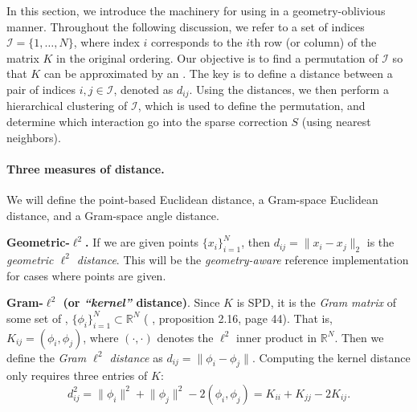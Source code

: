 In this section, we introduce the machinery for using \gofmm{} in a
geometry-oblivious manner. Throughout the following discussion, we refer to a
set of indices $\mathcal{I} = \{1,\dots,N\}$, where index $i$ corresponds to
the $i$th row (or column) of the matrix $K$ in the original ordering. Our
objective is to find a permutation of $\mathcal{I}$ so that $K$  can be
approximated by an \hmatrix{}. The key is to define a distance  between a pair
of indices $i,j\in\mathcal{I}$, denoted as $d_{ij}$. Using the distances, we
then perform a hierarchical clustering of $\mathcal{I}$, which is used to
define the permutation, and determine which interaction go into
the sparse correction $S$ (using nearest neighbors). 

\paragraph{Three measures of distance.} We will define the point-based Euclidean distance, a Gram-space Euclidean distance, and a Gram-space angle distance.

\textbf{Geometric-$\ell^2$.} If we are given points $\{x_i\}_{i=1}^N$, then 
$d_{ij} = \lVert x_i - x_j \rVert_2$ is
the \emph{geometric $\ell^2$ distance}. This will be the \emph{geometry-aware}
reference implementation for cases where points are given.

\textbf{Gram-$\ell^2$ (or \emph{``kernel''} distance)}. Since $K$ is SPD, it is
the \emph{Gram matrix} of some set of ,
$\{\phi_i\}_{i=1}^N \subset \mathbb{R}^N$  ( \cite{scholkopf-smola-02},
proposition 2.16, page 44).   That is, $K_{ij} = (\phi_i, \phi_j)$, where
$(\cdot,\cdot)$ denotes the $\ell^2$ inner product in $\mathbb{R}^N$.  Then we
define the \emph{Gram $\ell^2$ distance} as $d_{ij} = \lVert \phi_i - \phi_j
\rVert$. Computing the kernel distance only requires three entries of $K$:
\begin{equation}
  d_{ij}^2 = \lVert \phi_i \rVert^2 + \lVert \phi_j \rVert^2 - 2 (\phi_i, \phi_j) = K_{ii} + K_{jj} - 2K_{ij}. 
\end{equation}

